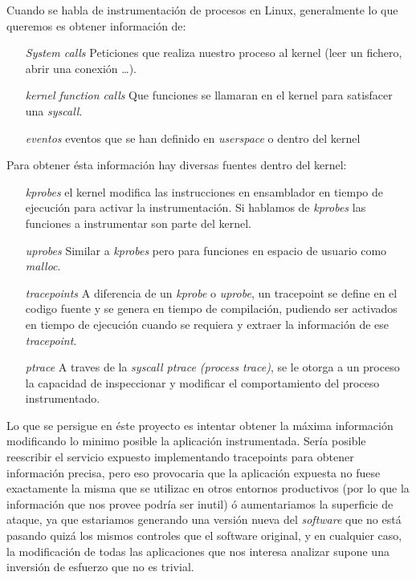 Cuando se habla de instrumentación de procesos en Linux, generalmente lo que queremos es obtener información de:
\begin{enumerate}
    \item[\emph{System calls}] Peticiones que realiza nuestro proceso al kernel (leer un fichero, abrir una conexión \ldots).
    \item[\emph{kernel function calls}] Que funciones se llamaran en el kernel para satisfacer una \emph{syscall}.
    \item[\emph{eventos}] eventos que se han definido en \emph{userspace} o dentro del kernel
\end{enumerate}

Para obtener ésta información hay diversas fuentes dentro del kernel:

\begin{enumerate}
    \item[\emph{kprobes}] el kernel modifica las instrucciones en ensamblador en tiempo de ejecución para activar la instrumentación. Si hablamos
    de \emph{kprobes} las funciones a instrumentar son parte del kernel. 
    \item[\emph{uprobes}] Similar a \emph{kprobes} pero para funciones en espacio de usuario como \emph{malloc}.
    \item[\emph{tracepoints}] A diferencia de un \emph{kprobe} o \emph{uprobe}, un tracepoint se define en el codigo fuente y se genera en tiempo de compilación, pudiendo ser activados en tiempo de ejecución cuando se requiera y extraer la información de ese \emph{tracepoint}.
    \item[\emph{ptrace}] A traves de la \emph{syscall ptrace (process trace)}, se le otorga a un proceso la capacidad de inspeccionar y modificar el comportamiento del proceso instrumentado. 
\end{enumerate}

Lo que se persigue en éste proyecto es intentar obtener la máxima información modificando lo minimo posible la aplicación instrumentada. Sería posible
reescribir el servicio expuesto implementando tracepoints para obtener información precisa, pero eso provocaria que la aplicación expuesta no fuese exactamente la misma que se utilizac
en otros entornos productivos (por lo que la información que nos provee podría ser inutil) ó aumentariamos la superficie de ataque, ya que estariamos
generando una versión nueva del \emph{software} que no está pasando quizá los mismos controles que el software original, y en cualquier caso, la modificación de todas las aplicaciones
que nos interesa analizar supone una inversión de esfuerzo que no es trivial.


